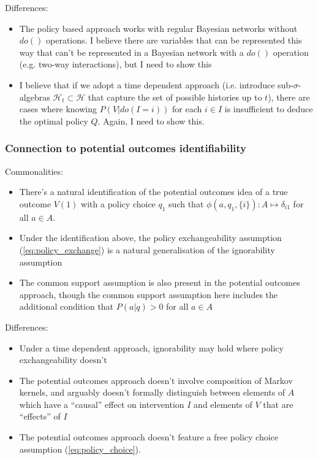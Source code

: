 Differences:

\begin{itemize}
    \item The policy based approach works with regular Bayesian networks without $do()$ operations. I believe there are variables that can be represented this way that can't be represented in a Bayesian network with a $do()$ operation (e.g. two-way interactions), but I need to show this
    \item I believe that if we adopt a time dependent approach (i.e. introduce sub-$\sigma$-algebras $\mathcal{H}_t\subset \mathcal{H}$ that capture the set of possible histories up to $t$), there are cases where knowing $P(V|do(I=i))$ for each $i\in I$ is insufficient to deduce the optimal policy $Q$. Again, I need to show this.
\end{itemize}

\subsubsection{Connection to potential outcomes identifiability}

Commonalities:

\begin{itemize}
    \item There's a natural identification of the potential outcomes idea of a true outcome $V(1)$ with a policy choice $q_1$ such that $\phi(a,q_1,\{i\}):A\mapsto \delta_{i1}$ for all $a\in A$.
    \item Under the identification above, the policy exchangeability assumption (\ref{eq:policy_exchange}) is a natural generalisation of the ignorability assumption
    \item The common support assumption is also present in the potential outcomes approach, though the common support assumption here includes the additional condition that $P(a|q) > 0$ for all $a\in A$
\end{itemize}

Differences:

\begin{itemize}
    \item Under a time dependent approach, ignorability may hold where policy exchangeability doesn't
    \item The potential outcomes approach doesn't involve composition of Markov kernels, and arguably doesn't formally distinguish between elements of $A$ which have a ``causal'' effect on intervention $I$ and elements of $V$ that are ``effects'' of $I$
    \item The potential outcomes approach doesn't feature a free policy choice assumption (\ref{eq:policy_choice}).
\end{itemize}


